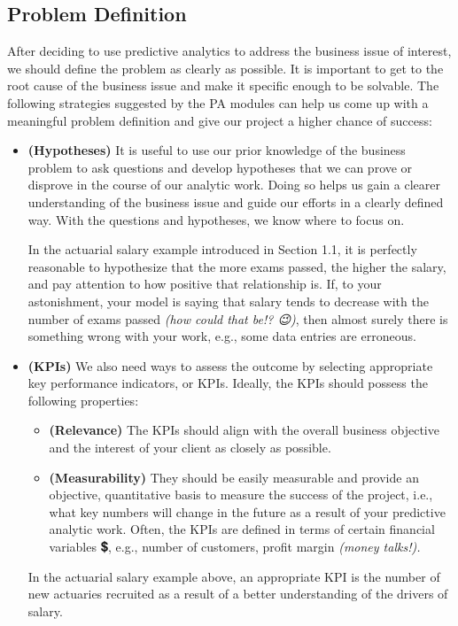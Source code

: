 \documentclass[
  12pt,
]{krantz}
\providecommand{\tightlist}{%
  \setlength{\itemsep}{0pt}\setlength{\parskip}{0pt}}
\renewenvironment{quote}{\begin{VF}}{\end{VF}}
\begin{document}
\subsection{Problem Definition}\label{problem-definition}

After deciding to use predictive analytics to address the business issue of
interest, we should define the problem as clearly as possible. It is important
to get to the root cause of the business issue and make it specific enough to be
solvable. The following strategies suggested by the PA modules can help us come
up with a meaningful problem definition and give our project a higher chance of
success:

\begin{itemize}
\item
  \textbf{(Hypotheses)} It is useful to use our prior knowledge of the business
  problem to ask questions and develop hypotheses that we can prove or
  disprove in the course of our analytic work. Doing so helps us gain a
  clearer understanding of the business issue and guide our efforts in a
  clearly defined way. With the questions and hypotheses, we know where to
  focus on.

  In the actuarial salary example introduced in Section 1.1, it is perfectly
  reasonable to hypothesize that the more exams passed, the higher the salary,
  and pay attention to how positive that relationship is. If, to your
  astonishment, your model is saying that salary tends to decrease with the
  number of exams passed \emph{(how could that be!? 😉)}, then almost surely there
  is something wrong with your work, e.g., some data entries are erroneous.
\item
  \textbf{(KPIs)} We also need ways to assess the outcome by selecting appropriate
  key performance indicators, or KPIs. Ideally, the KPIs should possess the
  following properties:

  \begin{quote}
  \begin{itemize}
  \tightlist
  \item
    \textbf{(Relevance)} The KPIs should align with the overall business
    objective and the interest of your client as closely as possible.
  \item
    \textbf{(Measurability)} They should be easily measurable and provide an
    objective, quantitative basis to measure the success of the project,
    i.e., what key numbers will change in the future as a result of your
    predictive analytic work. Often, the KPIs are defined in terms of
    certain financial variables 💲, e.g., number of customers, profit
    margin \emph{(money talks!).}
  \end{itemize}
  \end{quote}

  In the actuarial salary example above, an appropriate KPI is the number of
  new actuaries recruited as a result of a better understanding of the drivers
  of salary.
\end{itemize}
\end{document}
